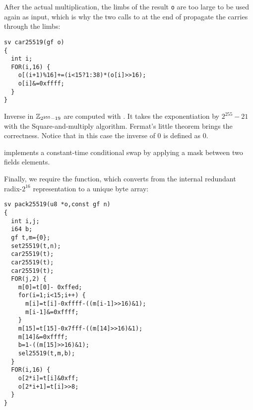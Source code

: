 After the actual multiplication, the limbs of the result \texttt{o} are
too large to be used again as input, which is why the two calls to
 at the end of  propagate the carries through the limbs:

\begin{lstlisting}[language=Ctweetnacl]
sv car25519(gf o)
{
  int i;
  FOR(i,16) {
    o[(i+1)%16]+=(i<15?1:38)*(o[i]>>16);
    o[i]&=0xffff;
  }
}
\end{lstlisting}

Inverse in $\mathbb{Z}_{2^{255}-19}$ are computed with .
It takes the exponentiation by $2^{255}-21$ with the Square-and-multiply algorithm.
Fermat's little theorem brings the correctness.
Notice that in this case the inverse of $0$ is defined as $0$.

 implements a constant-time conditional swap by applying a mask between
two fields elements.



Finally, we require the  function,
which converts from the internal redundant radix-$2^{16}$
representation to a unique byte array:

\begin{lstlisting}[language=Ctweetnacl]
sv pack25519(u8 *o,const gf n)
{
  int i,j;
  i64 b;
  gf t,m={0};
  set25519(t,n);
  car25519(t);
  car25519(t);
  car25519(t);
  FOR(j,2) {
    m[0]=t[0]- 0xffed;
    for(i=1;i<15;i++) {
      m[i]=t[i]-0xffff-((m[i-1]>>16)&1);
      m[i-1]&=0xffff;
    }
    m[15]=t[15]-0x7fff-((m[14]>>16)&1);
    m[14]&=0xffff;
    b=1-((m[15]>>16)&1);
    sel25519(t,m,b);
  }
  FOR(i,16) {
    o[2*i]=t[i]&0xff;
    o[2*i+1]=t[i]>>8;
  }
}
\end{lstlisting}

